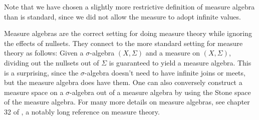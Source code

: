 \documentclass[a4paper]{amsproc}
\theoremstyle{plain}
\theoremstyle{definition}
\theoremstyle{remark}
\numberwithin{equation}{section}
\begin{document}
Note that we have chosen a slightly more restrictive definition of measure algebra than is standard, since we did not allow the measure to adopt infinite values.

Measure algebras are the correct setting for doing measure theory while ignoring the effects of nullsets. They connect to the more standard setting for measure theory as follows: Given a $\sigma$-algebra $(X,\Sigma)$ and a measure on $(X,\Sigma)$, dividing out the nullsets out of $\Sigma$ is guaranteed to yield a measure algebra. This is a surprising, since the $\sigma$-algebra doesn't need to have infinite joins or meets, but the measure algebra does have them. One can also conversely construct a measure space on a $\sigma$-algebra out of a measure algebra by using the Stone space of the measure algebra. For many more details on measure algebras, see chapter 32 of \cite{fremlin}, a notably long reference on measure theory.
\end{document}

